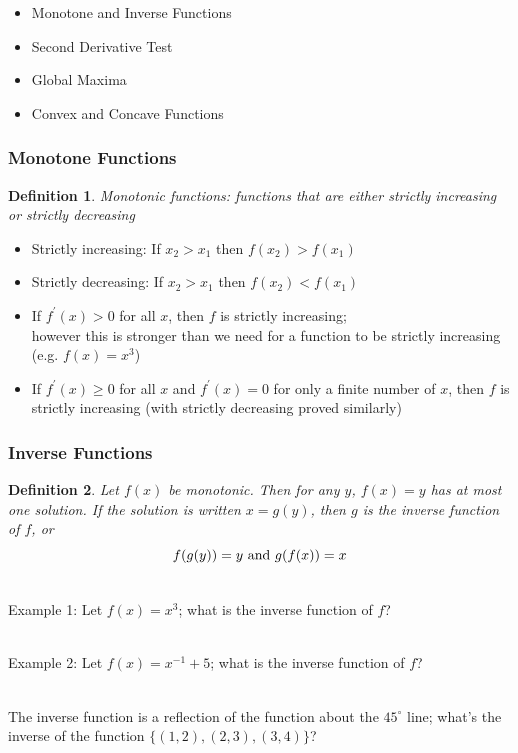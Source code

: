 \documentclass[aspectratio=169, handout]{beamer}
\newtheorem{defn}{Definition}
\numberwithin{equation}{section}
\begin{document}
\begin{frame}

\begin{itemize}
\item \textcolor{myblack}{Monotone and Inverse Functions}
\item \textcolor{mygray}{Second Derivative Test}
\item \textcolor{mygray}{Global Maxima}
\item \textcolor{mygray}{Convex and Concave Functions}
\end{itemize}

\end{frame}



\begin{frame}
\frametitle{Monotone Functions}

\begin{defn}
Monotonic functions: functions that are either \textit{strictly increasing} or \textit{strictly decreasing}
\end{defn} \pause

\begin{itemize}
\item Strictly increasing: If $x_2>x_1$ then $f(x_2)>f(x_1)$
\item Strictly decreasing: If $x_2>x_1$ then $f(x_2)<f(x_1)$ \pause
\item If $f^\prime(x)>0$ for all $x$, then $f$ is strictly increasing; \\however this is stronger than we need for a function to be strictly increasing (e.g. $f(x)=x^3$)
\item If $f^\prime(x)\geq 0$ for all $x$ and $f^\prime(x)=0$ for only a finite number of $x$, then $f$ is strictly increasing (with strictly decreasing proved similarly)
\end{itemize}

\end{frame}



\begin{frame}
\frametitle{Inverse Functions}

\begin{defn}
Let $f(x)$ be monotonic.  Then for any $y$, $f(x)=y$ has at most one solution. If the solution is written $x=g(y)$, then $g$ is the \textit{inverse function} of $f$, or $$f(g(y))=y \hbox{ and }g(f(x))=x$$
\end{defn} \pause

\ \\Example 1:  Let $f(x)=x^3$; what is the inverse function of $f$? \pause

\ \\Example 2: Let $f(x)=x^{-1}+5$; what is the inverse function of $f$? \pause

\ \\The inverse function is a reflection of the function about the $45^\circ$ line; what's the inverse of the function $\{(1, 2),(2, 3), (3, 4)\}$?

\end{frame}
\end{document}
